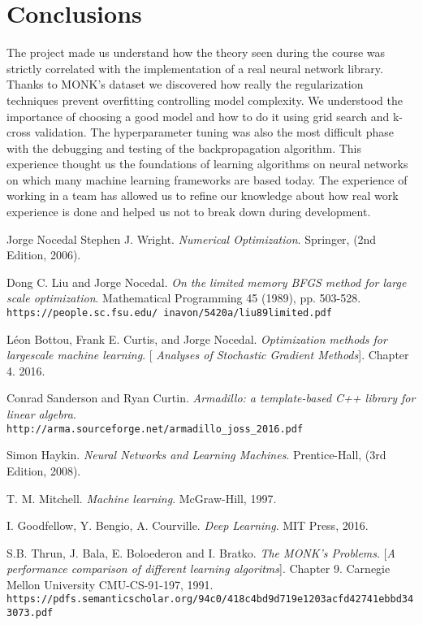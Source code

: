 \section{Conclusions}
The project made us understand how the theory seen during the course was strictly correlated with the implementation of a real neural network library. Thanks to MONK's dataset we discovered how really the regularization techniques prevent overfitting controlling model complexity. We understood the importance of choosing a good model and how to do it using grid search and k-cross validation. The hyperparameter tuning was also the most difficult phase with the debugging and testing of the backpropagation algorithm. This experience thought us the foundations of learning algorithms on neural networks on which many machine learning frameworks are based today. The experience of working in a team has allowed us to refine our knowledge about how real work experience is done and helped us not to break down during development.



\begin{thebibliography}{9}

	Jorge Nocedal  Stephen J. Wright.
	\textit{Numerical Optimization}. Springer, (2nd Edition, 2006).

	Dong C. Liu and Jorge Nocedal.
	\textit{On the limited memory BFGS method for large scale optimization}. Mathematical Programming 45 (1989), pp. 503-528.
	\\\texttt{https://people.sc.fsu.edu/~inavon/5420a/liu89limited.pdf}
		
	Léon Bottou, Frank E. Curtis, and Jorge Nocedal.
	\textit{Optimization methods for largescale machine learning}. 
	[\textit{ Analyses of Stochastic Gradient Methods}]. Chapter 4.
	2016.
	
	Conrad Sanderson and Ryan Curtin. 
	\textit{Armadillo: a template-based C++ library for linear algebra}. 
	\\\texttt{http://arma.sourceforge.net/armadillo\_joss\_2016.pdf}

	
	Simon Haykin. 
	\textit{Neural Networks and Learning Machines}. 
	Prentice-Hall, (3rd Edition, 2008).


	T. M. Mitchell. 
	\textit{Machine learning}. 
	McGraw-Hill, 1997.
	
	I. Goodfellow, Y. Bengio, A. Courville. 
	\textit{Deep Learning}. 
	MIT Press,  2016.
	
	S.B. Thrun, J. Bala, E. Boloederon and I. Bratko.
	\textit{The MONK's Problems}. 
	[\textit{A performance comparison of different learning algoritms}]. Chapter 9.
	Carnegie Mellon University CMU-CS-91-197, 1991.
	\\\texttt{https://pdfs.semanticscholar.org/94c0/418c4bd9d719e1203acfd42741ebbd343073.pdf}
	


	
\end{thebibliography}



